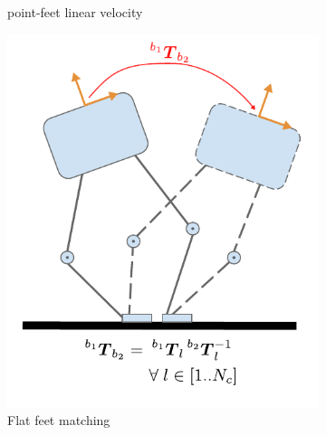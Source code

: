 \begin{figure}
\begin{subfigure}{.33\linewidth}
        \caption{point-feet linear velocity}
        \label{fig:kin_point_vel}
    \end{subfigure}%

    \bigskip
    \begin{subfigure}{.33\linewidth}
        \centering
        \includegraphics[width=\textwidth]{figures/robot_kinematic_types_flat_matching.pdf}
        \caption{Flat feet matching}
        \label{fig:kin_flat_matching}
    \end{subfigure}%
    \hfill
    \begin{subfigure}{.33\linewidth}
        \centering

\end{subfigure}
\end{figure}
